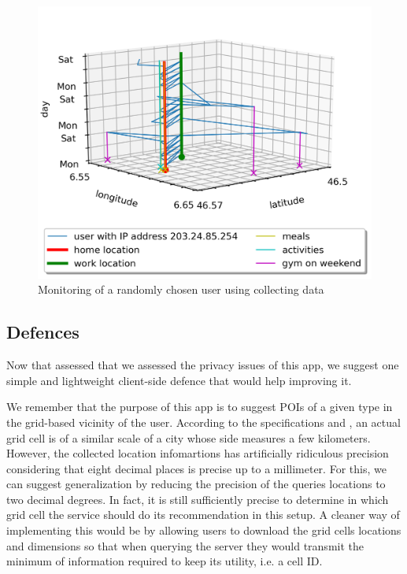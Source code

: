\documentclass[10pt,conference,compsocconf]{IEEEtran}
\begin{document}
\begin{figure}
  \includegraphics[width=\columnwidth]{random.png}
  \caption{Monitoring of a randomly chosen user using collecting data}
  \label{random_fig}
\end{figure}

\subsection{Defences}
Now that assessed that we assessed the privacy issues of this app, we suggest one simple and lightweight client-side defence that would help improving it.

We remember that the purpose of this app is to suggest POIs of a given type in the grid-based vicinity of the user. According to the specifications and \cite{deg}, an actual grid cell is of a similar scale of a city whose side measures a few kilometers. However, the collected location infomartions has artificially ridiculous precision considering that eight decimal places is precise up to a millimeter. For this, we can suggest generalization by reducing the precision of the queries locations to two decimal degrees. In fact, it is still sufficiently precise to determine in which grid cell the service should do its recommendation in this setup. A cleaner way of implementing this would be by allowing users to download the grid cells locations and dimensions so that when querying the server they would transmit the minimum of information required to keep its utility, i.e. a cell ID.
\end{document}
